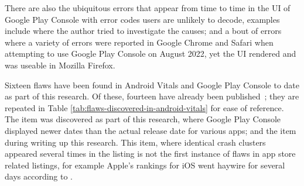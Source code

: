 \begin{kaobox}[frametitle=Ubiquitous errors in the GUI also occur]
There are also the ubiquitous errors that appear from time to time in the UI of Google Play Console with error codes users are unlikely to decode, examples include  where the author tried to investigate the causes; and a bout of errors where a variety of errors were reported in Google Chrome and Safari when attempting to use Google Play Console on  August 2022, yet the UI rendered and was useable in Mozilla Firefox.
\end{kaobox}

Sixteen flaws have been found in Android Vitals and Google Play Console to date as part of this research. Of these, fourteen have already been published~; they are repeated in Table \ref{tab:flaws-discovered-in-android-vitals} for ease of reference. The  item was discovered as part of this research, where Google Play Console displayed newer dates than the actual release date for various apps; and the  item during writing up this research. This  item, where identical crash clusters appeared several times in the listing is not the first instance of flaws in app store related listings, for example Apple's rankings for iOS went haywire for several days according to .


